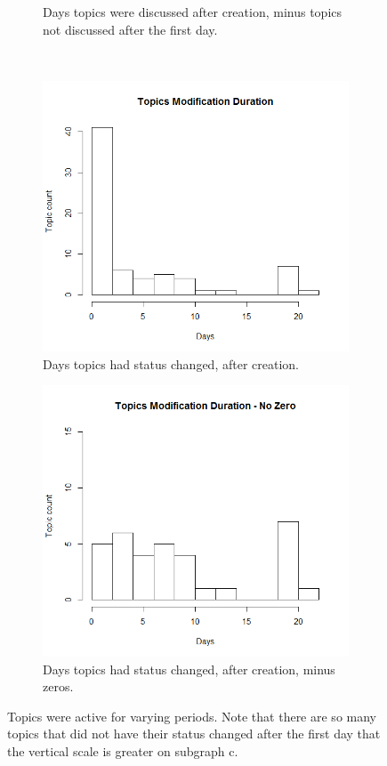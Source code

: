 \begin{figure}
\begin{subfigure}[b]{0.4\textwidth}
      \caption{Days topics were discussed after creation,
        minus topics not discussed after the first day.}
    \end{subfigure} \\
    \begin{subfigure}[b]{0.4\textwidth}
      \includegraphics[width=\textwidth]{topic_days_mod.png}
      \caption{Days topics had status changed, after creation.}
    \end{subfigure}
    \begin{subfigure}[b]{0.4\textwidth}
      \includegraphics[width=\textwidth]{topic_days_mod_nz.png}
      \caption{Days topics had status changed, after creation, minus zeros.}
    \end{subfigure}
  \caption[Duration of Topics] {
    Topics were active for varying periods.
    Note that there are so many topics that did not have their status changed
    after the first day that the vertical scale is greater on subgraph c.}
  \label{fig:topic_age}
  \end{figure}


